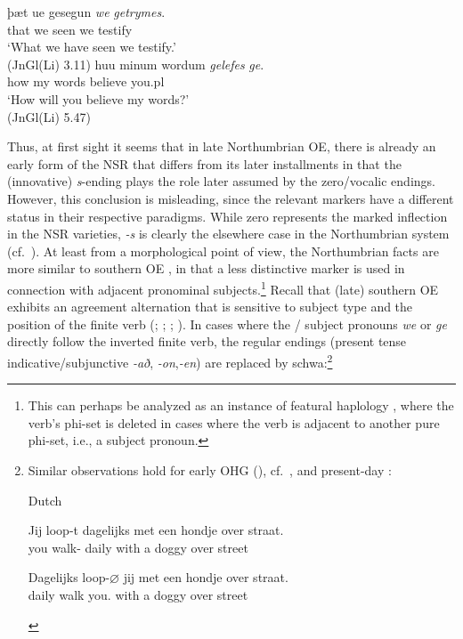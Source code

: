 \documentclass[output=paper]{langsci/langscibook}
\begin{document}
\ea
\ea
\label{exwege1}
\gll þæt ue gesegun \textit{we} \textit{getrymes}.\\
that we seen we testify\\
\glt`What we have seen we testify.'\\
(JnGl(Li) 3.11)
\ex
\gll huu minum wordum \textit{gelefes} \textit{ge}.\\
how my words believe you.pl\\
\glt `How will you believe my words?'\\
(JnGl(Li) 5.47)
\z
\z

Thus, at first sight it seems that in late Northumbrian \gls{OE}, there is
already an early form of the \gls{NSR} that differs from its later installments
in that the (innovative) \emph{s}-ending plays the role later assumed by the
zero/vocalic endings. However, this conclusion is misleading, since the
relevant markers have a different status in their respective paradigms. While
zero represents the marked inflection in the \gls{NSR} varieties, \emph{-s} is
clearly the elsewhere case in the Northumbrian  system (cf.\
). At least from a morphological point of view, the
Northumbrian facts are more similar to southern \gls{OE} ,
in that a less distinctive \isi{agreement} marker is used in connection with adjacent
pronominal subjects.\footnote{This can perhaps be analyzed as an instance of
    featural haplology \citep{Nevins:2012}, where the verb's phi-set is deleted
    in cases where the verb is adjacent to another pure phi-set, i.e., a
subject pronoun.}  Recall that (late) southern \gls{OE} exhibits an
agreement alternation that is sensitive to subject type and the position of
the finite verb (\citealt[15]{Jespersenpart4:1949};
\citealt[42]{QuirkWrenn:1955}; \citealt[296]{Campbell:1959};
\citealt{vanGelderen:2000}). In cases where the \Fpl/\Spl{} subject
pronouns \emph{we} or \emph{ge} directly follow the inverted finite verb,
the regular \isi{agreement} endings (present tense indicative/subjunctive
\emph{-að}, \emph{-on},\emph{-en}) are replaced by schwa:\footnote{Similar
    observations hold for early \gls{OHG} (\Fpl{}), cf.\
    \citet[262]{BrauneReiffenstein:2004}, and present-day 
    \citep[193]{AckNel:2004}:

    \begin{exe}
         Dutch
        \begin{xlisti}
        \ex
        \gll  Jij loop-t  dagelijks met een hondje over straat.\\
        you walk-\Ssg{} daily   with a  doggy over street\\
        \glt

        \ex
        \gll Dagelijks loop-{$\varnothing$} jij  met een hondje over straat.\\
        daily   walk  you.\Pl{} with a  doggy over street\\
    \end{xlisti}
\end{exe}}
\end{document}

